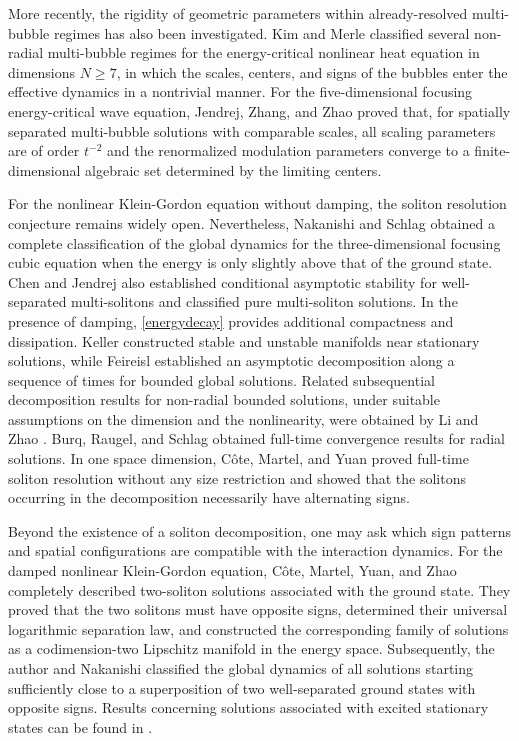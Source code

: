 \documentclass[10pt,a4paper]{amsart}
\numberwithin{equation}{section}
\begin{document}
More recently, the rigidity of geometric parameters within already-resolved multi-bubble regimes has also been investigated. Kim and Merle \cite{KM2} classified several non-radial multi-bubble regimes for the energy-critical nonlinear heat equation in dimensions $N\geq7$, in which the scales, centers, and signs of the bubbles enter the effective dynamics in a nontrivial manner. For the five-dimensional focusing energy-critical wave equation, Jendrej, Zhang, and Zhao \cite{JZZ} proved that, for spatially separated multi-bubble solutions with comparable scales, all scaling parameters are of order $t^{-2}$ and the renormalized modulation parameters converge to a finite-dimensional algebraic set determined by the limiting centers.


For the nonlinear Klein-Gordon equation without damping, the soliton resolution conjecture remains widely open. Nevertheless, Nakanishi and Schlag \cite{NS} obtained a complete classification of the global dynamics for the three-dimensional focusing cubic equation when the energy is only slightly above that of the ground state. Chen and Jendrej \cite{CJ} also established conditional asymptotic stability for well-separated multi-solitons and classified pure multi-soliton solutions. In the presence of damping, \eqref{energydecay} provides additional compactness and dissipation. Keller \cite{K1} constructed stable and unstable manifolds near stationary solutions, while Feireisl \cite{F} established an asymptotic decomposition along a sequence of times for bounded global solutions. Related subsequential decomposition results for non-radial bounded solutions, under suitable assumptions on the dimension and the nonlinearity, were obtained by Li and Zhao \cite{LZ}. Burq, Raugel, and Schlag \cite{BRS} obtained full-time convergence results for radial solutions. In one space dimension, C\^{o}te, Martel, and Yuan \cite{CMY} proved full-time soliton resolution without any size restriction and showed that the solitons occurring in the decomposition necessarily have alternating signs.


Beyond the existence of a soliton decomposition, one may ask which sign patterns and spatial configurations are compatible with the interaction dynamics. For the damped nonlinear Klein-Gordon equation, C\^{o}te, Martel, Yuan, and Zhao \cite{CMYZ} completely described two-soliton solutions associated with the ground state. They proved that the two solitons must have opposite signs, determined their universal logarithmic separation law, and constructed the corresponding family of solutions as a codimension-two Lipschitz manifold in the energy space. Subsequently, the author and Nakanishi \cite{IN} classified the global dynamics of all solutions starting sufficiently close to a superposition of two well-separated ground states with opposite signs. Results concerning solutions associated with excited stationary states can be found in \cite{CY}.
\end{document}
